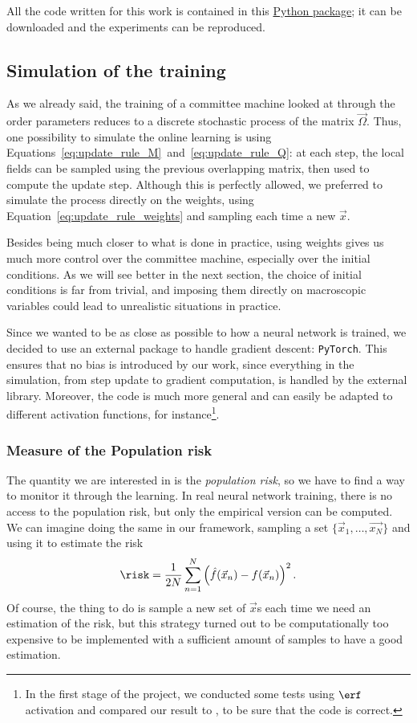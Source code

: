 All the code written for this work is contained in this \href{https://github.com/arn4/master-thesis/tree/main/code/committee_learning_package}{Python package};
it can be downloaded and the experiments can be reproduced.


\subsection{Simulation of the training}
As we already said, the training of a committee machine looked at through the order parameters
reduces to a discrete stochastic process of the matrix \(\vec{\Omega}\). Thus, one possibility
to simulate the online learning is using Equations~\eqref{eq:update_rule_M}~and~\eqref{eq:update_rule_Q}:
at each step, the local fields can be sampled using the previous overlapping matrix, then
used to compute the update step. Although this is perfectly allowed, we preferred
to simulate the process directly on the weights, using Equation~\eqref{eq:update_rule_weights}
and sampling each time a new \(\vec{x}\).

Besides being much closer to what is done in practice, using weights gives us much more control over
the committee machine, especially over the initial conditions. 
As we will see better in the next section, the choice of initial conditions is far from trivial,
and imposing them directly on macroscopic variables could lead to unrealistic situations in practice.

Since we wanted to be as close as possible to how a neural network is trained,
we decided to use an external package to handle gradient descent: \texttt{PyTorch}\cite{pytorch2019}.
This ensures that no bias is introduced by our work, since everything in the simulation,
from step update to gradient computation, is handled by the external library.
Moreover, the code is much more general and can easily be adapted to different activation
functions, for instance\footnote{
    In the first stage of the project, we conducted some tests using \(\erf\) activation and compared
    our result to \cite{veiga2022phase}, to be sure that the code is correct.
}.

\subsubsection{Measure of the Population risk}
The quantity we are interested in is the \emph{population risk}, so we have to find
a way to monitor it through the learning. In real neural network training, there is 
no access to the population risk, but only the empirical version can be computed.
We can imagine doing the same in our framework, sampling a set \(\{\vec{x}_1,\dots,\vec{x_N}\}\) 
and using it to estimate the risk
\[\risk = \frac{1}{2N}\sum_{n=1}^N\left(\hat{f}(\vec{x}_n)-f(\vec{x}_n)\right)^2.\]
Of course, the thing to do is sample a new set of \(\vec{x}\)s each time we need an estimation
of the risk, but this strategy turned out to be computationally too expensive to be
implemented with a sufficient amount of samples to have a good estimation.

